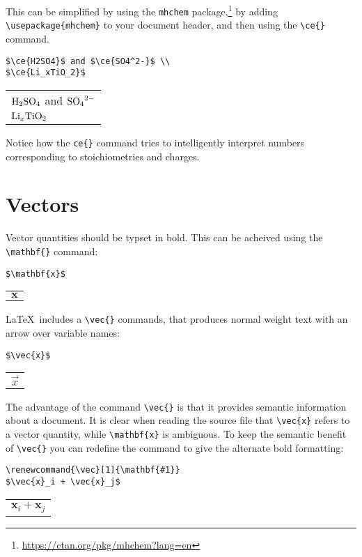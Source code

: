 \documentclass[a4paper]{tufte-handout}
\begin{document}
This can be simplified by using the \lstinline{mhchem} package,\footnote{\url{https://ctan.org/pkg/mhchem?lang=en}} by adding \lstinline$\usepackage{mhchem}$ to your document header, and then using the \lstinline$\ce{}$ command.
\begin{lstlisting}
$\ce{H2SO4}$ and $\ce{SO4^2-}$ \\
$\ce{Li_xTiO_2}$
\end{lstlisting}
\begin{tabular}{|p{10cm}}
$\ce{H2SO4}$ and $\ce{SO4^2-}$ \\
$\ce{Li_xTiO2}$
\end{tabular}

Notice how the \lstinline$ce{}$ command tries to intelligently interpret numbers corresponding to stoichiometries and charges.

\section{Vectors}
Vector quantities should be typset in bold. This can be acheived using the \lstinline$\mathbf{}$ command:
\begin{lstlisting}
$\mathbf{x}$
\end{lstlisting}
\begin{tabular}{|p{10cm}}
$\mathbf{x}$
\end{tabular}

\LaTeX\ includes a \lstinline$\vec{}$ commands, that produces normal weight text with an arrow over variable names:
\begin{lstlisting}
$\vec{x}$
\end{lstlisting}
\begin{tabular}{|p{10cm}}
$\vec{x}$
\end{tabular}

The advantage of the command \lstinline$\vec{}$ is that it provides semantic information about a document. It is clear when reading the source file that \lstinline$\vec{x}$ refers to a vector quantity, while \lstinline$\mathbf{x}$ is ambiguous. To keep the semantic benefit of \lstinline$\vec{}$ you can redefine the command to give the alternate bold formatting:
\begin{lstlisting}
\renewcommand{\vec}[1]{\mathbf{#1}}
$\vec{x}_i + \vec{x}_j$
\end{lstlisting}
\begin{tabular}{|p{10cm}}
\renewcommand{\vec}[1]{\mathbf{#1}}
$\vec{x}_i + \vec{x}_j$
\end{tabular}
\end{document}
